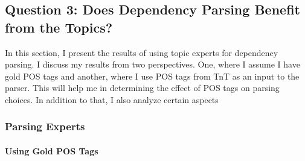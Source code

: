 


\subsection{Question 3: Does Dependency Parsing Benefit from the Topics?}

In this section, I present the results of using topic experts for dependency parsing. I discuss my results from two perspectives. One, where I assume I have gold POS tags and another, where I use POS tags from TnT as an input to the parser. This will help me in determining the effect of POS tags on parsing choices. In addition to that, I also analyze certain aspects 

\subsubsection{Parsing Experts}

\paragraph*{Using Gold POS Tags}\label{sec:goldpos}

